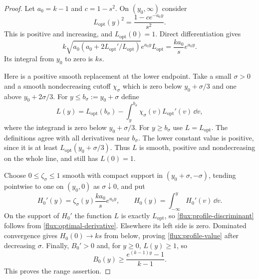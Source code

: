 \begin{proof}
Let $a_0=k-1$ and $c=1-s^2$.  On $(y_0,\infty)$ consider
\begin{equation}
 L_{\mathrm{opt}}(y)^2=
 \frac{1-c e^{-a_0y}}{s^2}.
 \label{flux:optimal-profile}
\end{equation}
This is positive and increasing, and $L_{\mathrm{opt}}(0)=1$.  Direct
differentiation gives
\begin{equation}
 k\sqrt{a_0(a_0+2L_{\mathrm{opt}}'/L_{\mathrm{opt}})}
 e^{a_0y}L_{\mathrm{opt}}=
 \frac{ka_0}{s}e^{a_0y}.
 \label{flux:optimal-derivative}
\end{equation}
Its integral from $y_0$ to zero is $ks$.

Here is a positive smooth replacement at the lower endpoint.  Take a small
$\sigma>0$ and a smooth nondecreasing cutoff $\chi_\sigma$ which is zero
below $y_0+\sigma/3$ and one above $y_0+2\sigma/3$.  For
$y\leq b_\sigma:=y_0+\sigma$ define
\begin{equation}
 L(y)=L_{\mathrm{opt}}(b_\sigma)
 -\int_y^{b_\sigma}
   \chi_\sigma(v)L_{\mathrm{opt}}'(v)\,\dd v,
 \label{flux:profile-smoothing}
\end{equation}
where the integrand is zero below $y_0+\sigma/3$.  For $y\geq b_\sigma$
use $L=L_{\mathrm{opt}}$.  The definitions agree with all derivatives near
$b_\sigma$.  The lower constant value is positive, since it is at least
$L_{\mathrm{opt}}(y_0+\sigma/3)$.  Thus $L$ is smooth, positive and
nondecreasing on the whole line, and still has $L(0)=1$.

Choose $0\leq\zeta_\sigma\leq1$ smooth with compact support in
$(y_0+\sigma,-\sigma)$, tending pointwise to one on $(y_0,0)$ as
$\sigma\downarrow0$, and put
\begin{equation}
 H_0'(y)=\zeta_\sigma(y)\frac{ka_0}{s}e^{a_0y},
 \qquad H_0(y)=\int_{-\infty}^y H_0'(v)\,\dd v.
 \label{flux:H-construction}
\end{equation}
On the support of $H_0'$ the function $L$ is exactly
$L_{\mathrm{opt}}$, so \eqref{flux:profile-discriminant} follows from
\eqref{flux:optimal-derivative}.  Elsewhere its left side is zero.
Dominated convergence gives $H_0(0)\to ks$ from below, proving
\eqref{flux:profile-value} after decreasing $\sigma$.
Finally, $B_0'>0$ and, for $y\geq0$, $L(y)\geq1$, so
\begin{equation}
 B_0(y)\geq\frac{e^{(k-1)y}-1}{k-1}.
 \label{flux:B-growth}
\end{equation}
This proves the range assertion.
\end{proof}

